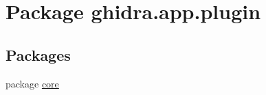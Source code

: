 \hypertarget{namespaceghidra_1_1app_1_1plugin}{}\section{Package ghidra.\+app.\+plugin}
\label{namespaceghidra_1_1app_1_1plugin}
\subsection*{Packages}
\begin{DoxyCompactItemize}
\item 
package \mbox{\hyperlink{namespaceghidra_1_1app_1_1plugin_1_1core}{core}}
\end{DoxyCompactItemize}
